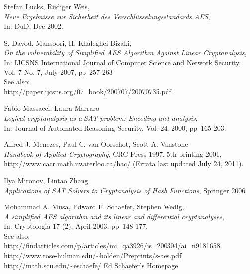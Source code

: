 \begin{thebibliography}{99999}
  
       Stefan Lucks, R\"udiger Weis, \\
       {\em Neue Ergebnisse zur Sicherheit des Verschl\"usselungsstandards AES},\\
       In: DuD, Dec 2002.

  
       S. Davod. Mansoori, H. Khaleghei Bizaki, \\
       {\em On the vulnerability of Simplified AES Algorithm Against Linear
       Cryptanalysis}, \\
       In: IJCSNS International Journal of Computer Science and Network
       Security, Vol. 7 No. 7, July 2007, pp~257-263 \\
       See also:\\
       \url{http://paper.ijcsns.org/07_book/200707/20070735.pdf}

 
       Fabio Massacci, Laura Marraro \\
       {\em Logical cryptanalysis as a SAT problem: Encoding and analysis},\\ 
       In: Journal of Automated Reasoning Security,
       Vol. 24, 2000, pp~165-203.

 
       Alfred J. Menezes, Paul C. van Oorschot, Scott A. Vanstone \\
       {\em Handbook of Applied Cryptography}, 
       CRC Press 1997, 5th printing 2001,\\
       \url{http://www.cacr.math.uwaterloo.ca/hac/} (Errata last updated July 24, 2011).

 
       Ilya Mironov, Lintao Zhang \\
       {\em Applications of SAT Solvers to Cryptanalysis of Hash Functions}, 
       Springer 2006

  
       Mohammad A. Musa, Edward F. Schaefer, Stephen Wedig, \\
       {\em A simplified AES algorithm and its linear and differential cryptanalyses}, \\
       In: Cryptologia 17 (2), April 2003, pp~148-177.\\
       See also:\\
       \url{http://findarticles.com/p/articles/mi_qa3926/is_200304/ai_n9181658}\\
       \url{http://www.rose-hulman.edu/~holden/Preprints/s-aes.pdf}\\
       \url{http://math.scu.edu/~eschaefe/}   Ed Schaefer's Homepage


\end{thebibliography}
